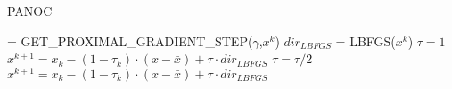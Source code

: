 		\begin{algorithm}
			\caption{PANOC}
			\label{alg:PANOC}
			\begin{algorithmic}[1]
				 = GET\_PROXIMAL\_GRADIENT\_STEP($\gamma$,$x^k$)
				\State $ dir_{LBFGS}$ = LBFGS($x^k$)
				\State $\tau =1$
				\State $x^{k+1} = x_k - (1-\tau_k)\cdot (x-\bar{x}) + \tau \cdot dir_{LBFGS}$
				\State $\tau = \tau / 2$
				\State $x^{k+1} = x_k - (1-\tau_k)\cdot (x-\bar{x}) + \tau \cdot dir_{LBFGS}$
				\EndWhile
				\EndProcedure
			\end{algorithmic}
		\end{algorithm}
	